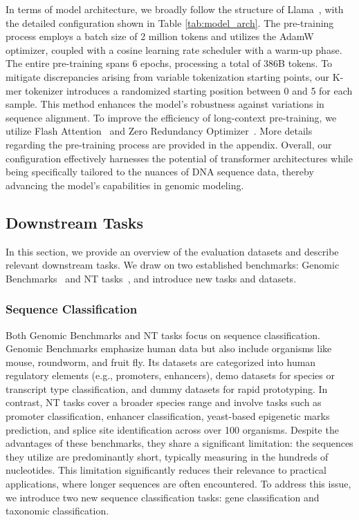 In terms of model architecture, we broadly follow the structure of Llama~\cite{llama,tiny-llama}, with the detailed configuration shown in Table \ref{tab:model_arch}. The pre-training process employs a batch size of 2 million tokens and utilizes the AdamW~\cite{adamw} optimizer, coupled with a cosine learning rate scheduler with a warm-up phase. The entire pre-training spans 6 epochs, processing a total of 386B tokens. To mitigate discrepancies arising from variable tokenization starting points, our K-mer tokenizer introduces a randomized starting position between 0 and 5 for each sample. This method enhances the model's robustness against variations in sequence alignment. To improve the efficiency of long-context pre-training, we utilize Flash Attention~\cite{flashattention} and Zero Redundancy Optimizer~\cite{deepspeed}. More details regarding the pre-training process are provided in the appendix. Overall, our configuration effectively harnesses the potential of transformer architectures while being specifically tailored to the nuances of DNA sequence data, thereby advancing the model's capabilities in genomic modeling.



\subsection{Downstream Tasks}
In this section, we provide an overview of the evaluation datasets and describe relevant downstream tasks. We draw on two established benchmarks: Genomic Benchmarks~\cite{genomic-benchmarks} and NT tasks~\cite{nucleotide-transformer}, and introduce new tasks and datasets.

\subsubsection{Sequence Classification}
Both Genomic Benchmarks and NT tasks focus on sequence classification. Genomic Benchmarks emphasize human data but also include organisms like mouse, roundworm, and fruit fly. Its datasets are categorized into human regulatory elements (e.g., promoters, enhancers), demo datasets for species or transcript type classification, and dummy datasets for rapid prototyping. In contrast, NT tasks cover a broader species range and involve tasks such as promoter classification, enhancer classification, yeast-based epigenetic marks prediction, and splice site identification across over 100 organisms. Despite the advantages of these benchmarks, they share a significant limitation: the sequences they utilize are predominantly short, typically measuring in the hundreds of nucleotides. This limitation significantly reduces their relevance to practical applications, where longer sequences are often encountered. To address this issue, we introduce two new sequence classification tasks: gene classification and taxonomic classification.

